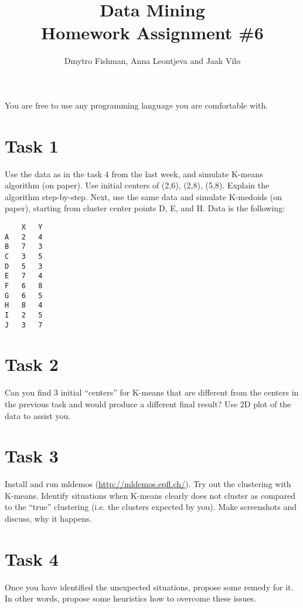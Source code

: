 \documentclass{article}
\title{Data Mining\\Homework Assignment \#6} %
\author{Dmytro Fishman, Anna Leontjeva and Jaak Vilo} %
\begin{document}
\maketitle %

You are free to use any programming language you are comfortable with.

\section*{Task 1}
Use the data as in the task 4 from the last week, and simulate K-means algorithm (on paper). Use initial centers of (2,6), (2,8), (5,8). Explain the algorithm step-by-step. 
Next, use the same data and simulate K-medoids (on paper), starting from cluster center points D, E, and H. Data is the following:
\begin{lstlisting}
	X	Y
A	2	4
B	7	3
C	3	5
D	5	3
E	7	4
F	6	8
G	6	5
H	8	4
I	2	5
J	3	7
\end{lstlisting}
\section*{Task 2}
Can you find 3 initial ``centers'' for K-means that are different from the centers in the previous task and would produce a different final result? Use 2D plot of the data to assist you.

\section*{Task 3}
Install and run mldemos (\url{http://mldemos.epfl.ch/}). Try out the clustering with K-means. Identify situations when K-means clearly does not cluster as compared  to the “true” clustering (i.e. the clusters expected by you). Make screenshots and discuss, why it happens. 

\section*{Task 4}
Once you have identified the unexpected situations, propose some remedy for it. In other words, propose some heuristics how to overcome these issues.
\end{document}
